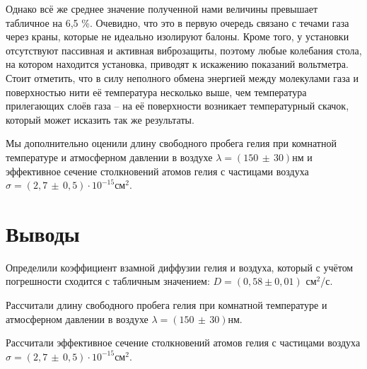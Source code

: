 \documentclass[a4paper,12pt]{article} %
\begin{document}
	Однако всё же среднее значение полученной нами величины превышает табличное на 6,5 \%. Очевидно, что это в первую очередь связано с течами газа через краны, которые не идеально изолируют балоны. Кроме того, у установки отсутствуют пассивная и активная виброзащиты, поэтому любые колебания стола, на котором находится установка, приводят к искажению показаний вольтметра. Стоит отметить, что в силу неполного обмена энергией между молекулами газа и поверхностью нити её температура несколько выше, чем температура прилегающих слоёв газа -- на её поверхности возникает температурный скачок, который может исказить так же результаты.
	
	Мы дополнительно оценили длину свободного пробега гелия при комнатной температуре и атмосферном давлении в воздухе $\lambda = (150 \,\pm \, 30)$нм и эффективное сечение столкновений атомов гелия с частицами воздуха $\sigma = (2,7 \, \pm \, 0,5) \cdot 10^{-15}$см$^2$. 
	
\section*{Выводы}
	\enumerate
		\item
			Определили коэффициент взамной диффузии гелия и воздуха, который с учётом погрешности сходится с табличным значением: $D = (0,58 \pm 0,01)$ см$^2$/с.
		\item
			Рассчитали длину свободного пробега гелия при комнатной температуре и атмосферном давлении в воздухе $\lambda = (150 \,\pm \, 30)$нм.
		\item
			Рассчитали эффективное сечение столкновений атомов гелия с частицами воздуха $\sigma = (2,7 \, \pm \, 0,5) \cdot 10^{-15}$см$^2$.
\end{document}
